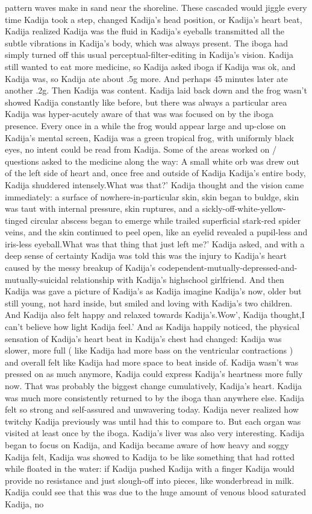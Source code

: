 \documentclass[12pt]{book}
\begin{document}
pattern waves make in sand near the shoreline. These cascaded would jiggle every time Kadija took a step, changed Kadija's head position, or Kadija's heart beat, Kadija realized Kadija was the fluid in Kadija's eyeballs transmitted all the subtle vibrations in Kadija's body, which was always present. The iboga had simply turned off this usual perceptual-filter-editing in Kadija's vision. Kadija still wanted to eat more medicine, so Kadija asked iboga if Kadija was ok, and Kadija was, so Kadija ate about .5g more. And perhaps 45 minutes later ate another .2g. Then Kadija was content. Kadija laid back down and the frog wasn't showed Kadija constantly like before, but there was always a particular area Kadija was hyper-acutely aware of that was was focused on by the iboga presence. Every once in a while the frog would appear large and up-close on Kadija's mental screen, Kadija was a green tropical frog, with uniformly black eyes, no intent could be read from Kadija. Some of the areas worked on / questions asked to the medicine along the way: A small white orb was drew out of the left side of heart and, once free and outside of Kadija Kadija's entire body, Kadija shuddered intensely.What was that?' Kadija thought and the vision came immediately: a surface of nowhere-in-particular skin, skin began to buldge, skin was taut with internal pressure, skin ruptures, and a sickly-off-white-yellow-tinged circular abscess began to emerge while trailed superficial stark-red spider veins, and the skin continued to peel open, like an eyelid revealed a pupil-less and iris-less eyeball.What was that thing that just left me?' Kadija asked, and with a deep sense of certainty Kadija was told this was the injury to Kadija's heart caused by the messy breakup of Kadija's codependent-mutually-depressed-and-mutually-suicidal relationship with Kadija's highschool girlfriend. And then Kadija was gave a picture of Kadija's as Kadija imagine Kadija's now, older but still young, not hard inside, but smiled and loving with Kadija's two children. And Kadija also felt happy and relaxed towards Kadija's.Wow', Kadija thought,I can't believe how light Kadija feel.' And as Kadija happily noticed, the physical sensation of Kadija's heart beat in Kadija's chest had changed: Kadija was slower, more full ( like Kadija had more bass on the ventricular contractions ) and overall felt like Kadija had more space to beat inside of. Kadija wasn't was pressed on as much anymore, Kadija could express Kadija's heartness more fully now. That was probably the biggest change cumulatively, Kadija's heart. Kadija was much more consistently returned to by the iboga than anywhere else. Kadija felt so strong and self-assured and unwavering today. Kadija never realized how twitchy Kadija previously was until had this to compare to. But each organ was visited at least once by the iboga. Kadija's liver was also very interesting. Kadija began to focus on Kadija, and Kadija became aware of how heavy and soggy Kadija felt, Kadija was showed to Kadija to be like something that had rotted while floated in the water: if Kadija pushed Kadija with a finger Kadija would provide no resistance and just slough-off into pieces, like wonderbread in milk. Kadija could see that this was due to the huge amount of venous blood saturated Kadija, no 
\end{document}
